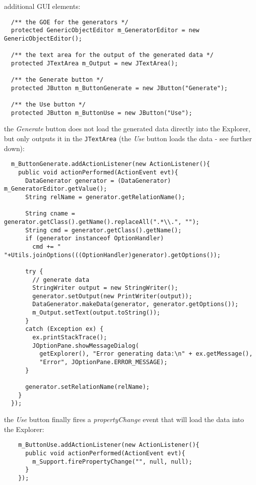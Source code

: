 \begin{tight_itemize}
  \newpage
  \item additional GUI elements:
  \begin{verbatim}
  /** the GOE for the generators */
  protected GenericObjectEditor m_GeneratorEditor = new GenericObjectEditor();

  /** the text area for the output of the generated data */
  protected JTextArea m_Output = new JTextArea();

  /** the Generate button */
  protected JButton m_ButtonGenerate = new JButton("Generate");

  /** the Use button */
  protected JButton m_ButtonUse = new JButton("Use");
  \end{verbatim}

  \item the \textit{Generate} button does not load the generated data directly
into the Explorer, but only outputs it in the \texttt{JTextArea} (the
\textit{Use} button loads the data - see further down):
  \begin{verbatim}
  m_ButtonGenerate.addActionListener(new ActionListener(){
    public void actionPerformed(ActionEvent evt){
      DataGenerator generator = (DataGenerator) m_GeneratorEditor.getValue();
      String relName = generator.getRelationName();

      String cname = generator.getClass().getName().replaceAll(".*\\.", "");
      String cmd = generator.getClass().getName();
      if (generator instanceof OptionHandler)
        cmd += " "+Utils.joinOptions(((OptionHandler)generator).getOptions());

      try {
        // generate data
        StringWriter output = new StringWriter();
        generator.setOutput(new PrintWriter(output));
        DataGenerator.makeData(generator, generator.getOptions());
        m_Output.setText(output.toString());
      }
      catch (Exception ex) {
        ex.printStackTrace();
        JOptionPane.showMessageDialog(
          getExplorer(), "Error generating data:\n" + ex.getMessage(),
          "Error", JOptionPane.ERROR_MESSAGE);
      }

      generator.setRelationName(relName);
    }
  });
  \end{verbatim}

  \item the \textit{Use} button finally fires a \textit{propertyChange} event
that will load the data into the Explorer:
  \begin{verbatim}
    m_ButtonUse.addActionListener(new ActionListener(){
      public void actionPerformed(ActionEvent evt){
        m_Support.firePropertyChange("", null, null);
      }
    });
  \end{verbatim}


\end{tight_itemize}
